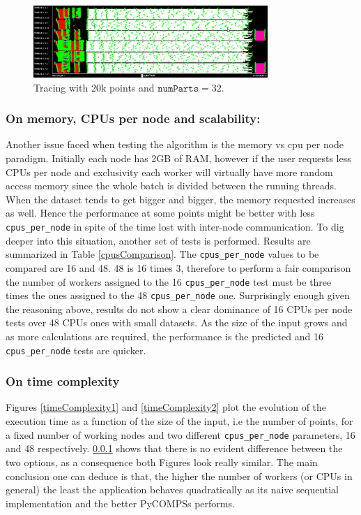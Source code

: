 \documentclass[10pt,journal,compsoc]{IEEEtran}
\let\MYoriglatexcaption\caption
\renewcommand{\caption}[2][\relax]{\MYoriglatexcaption[#2]{#2}}
\begin{document}
\begin{figure}[!h]
\centering
\includegraphics[width=3.5in]{img/traca_mes_caca.png}
\caption{Tracing with 20k points and $\texttt{numParts}=32$.}
\label{traca_caca}
\end{figure}

\subsubsection{On memory, CPUs per node and scalability:} \label{q_coi_passa}

Another issue faced when testing the algorithm is the memory vs cpu per node paradigm. Initially each node has 2GB of RAM, however if the user requests less CPUs per node and exclusivity each worker will virtually have more random access memory since the whole batch is divided between the running threads. When the dataset tends to get bigger and bigger, the memory requested increases as well. Hence the performance at some points might be better with less \texttt{cpus\_per\_node} in spite of the time lost with inter-node communication. To dig deeper into this situation, another set of tests is performed. Results are summarized in Table \ref{cpusComparison}. The \texttt{cpus\_per\_node} values to be compared are 16 and 48. 48 is 16 times 3, therefore to perform a fair comparison the number of workers assigned to the 16 \texttt{cpus\_per\_node} test must be three times the ones assigned to the 48 \texttt{cpus\_per\_node} one. Surprisingly enough given the reasoning above, results do not show a clear dominance of 16 CPUs per node tests over 48 CPUs ones with small datasets. As the size of the input grows and as more calculations are required, the performance is the predicted and 16 \texttt{cpus\_per\_node} tests are quicker.

\subsubsection{On time complexity}

Figures \ref{timeComplexity1} and \ref{timeComplexity2} plot the evolution of the execution time as a function of the size of the input, i.e the number of points, for a fixed number of working nodes and two different \texttt{cpus\_per\_node} parameters, 16 and 48 respectively. \ref{q_coi_passa} shows that there is no evident difference between the two options, as a consequence both Figures look really similar. The main conclusion one can deduce is that, the higher the number of workers (or CPUs in general) the least the application behaves quadratically as its naive sequential implementation and the better PyCOMPSs performs.
\end{document}
